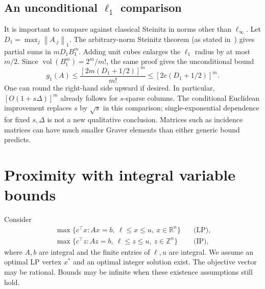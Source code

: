 \documentclass[11pt]{article}
\theoremstyle{definition}
\theoremstyle{remark}
\newcommand{\R}{\mathbb R}
\newcommand{\Z}{\mathbb Z}
\newcommand{\norm}[1]{\left\lVert #1\right\rVert}
\DeclareMathOperator{\vol}{vol}
\begin{document}
\subsection{An unconditional \texorpdfstring{$\ell_1$}{l1} comparison}
It is important to compare against classical Steinitz in norms other than
$\ell_\infty$. Let $D_1=\max_j\norm{A_{\cdot j}}_1$.
The arbitrary-norm Steinitz theorem (as stated in~\cite{EHK}) gives
partial sums in $mD_1B_1^m$.
Adding unit cubes enlarges the $\ell_1$ radius by at most $m/2$.
Since $\vol(B_1^m)=2^m/m!$, the same proof gives the unconditional bound
\[
 g_1(A)\le\frac{[2m(D_1+1/2)]^m}{m!}
 \le[2e(D_1+1/2)]^m.
 \tag{4}\label{eq:l1}
\]
One can round the right-hand side upward if desired. In particular,
$[O(1+s\Delta)]^m$ already follows for $s$-sparse columns. The
conditional Euclidean improvement replaces $s$ by $\sqrt s$ in this
comparison; single-exponential dependence for fixed $s,\Delta$ is not
a new qualitative conclusion. Matrices such as incidence matrices can
have much smaller Graver elements than either generic bound predicts.

\section{Proximity with integral variable bounds}\label{sec:proximity}

Consider
\begin{align*}
 \max\{c^\top x:Ax=b,\ \ell\le x\le u,\ x\in\R^n\}&\quad\text{(LP)},\\
 \max\{c^\top z:Az=b,\ \ell\le z\le u,\ z\in\Z^n\}&\quad\text{(IP)},
\end{align*}
where $A,b$ are integral and the finite entries of $\ell,u$ are integral.
We assume an optimal LP vertex $x^*$ and an optimal integer solution exist.
The objective vector may be rational. Bounds may be infinite when these
existence assumptions still hold.
\end{document}
